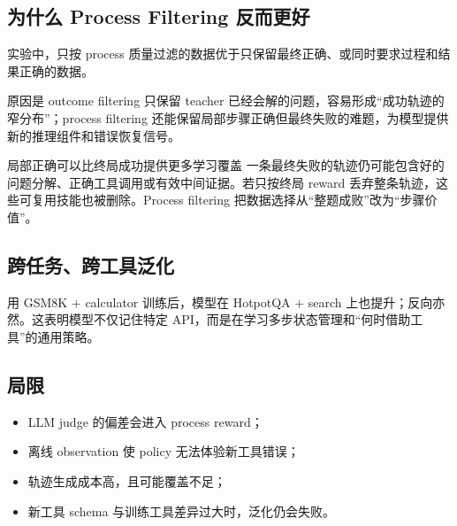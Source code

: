 \documentclass[a4paper]{article}
\begin{document}

\subsection{为什么 Process Filtering 反而更好}

实验中，只按 process 质量过滤的数据优于只保留最终正确、或同时要求过程和结果正确的数据。


原因是 outcome filtering 只保留 teacher 已经会解的问题，容易形成“成功轨迹的窄分布”；process filtering 还能保留局部步骤正确但最终失败的难题，为模型提供新的推理组件和错误恢复信号。

\begin{importantbox}{局部正确可以比终局成功提供更多学习覆盖}
一条最终失败的轨迹仍可能包含好的问题分解、正确工具调用或有效中间证据。若只按终局 reward 丢弃整条轨迹，这些可复用技能也被删除。Process filtering 把数据选择从“整题成败”改为“步骤价值”。
\end{importantbox}

\subsection{跨任务、跨工具泛化}

用 GSM8K + calculator 训练后，模型在 HotpotQA + search 上也提升；反向亦然。这表明模型不仅记住特定 API，而是在学习多步状态管理和“何时借助工具”的通用策略。




\subsection{局限}

\begin{itemize}
    \item LLM judge 的偏差会进入 process reward；
    \item 离线 observation 使 policy 无法体验新工具错误；
    \item 轨迹生成成本高，且可能覆盖不足；
    \item 新工具 schema 与训练工具差异过大时，泛化仍会失败。
\end{itemize}
\end{document}
